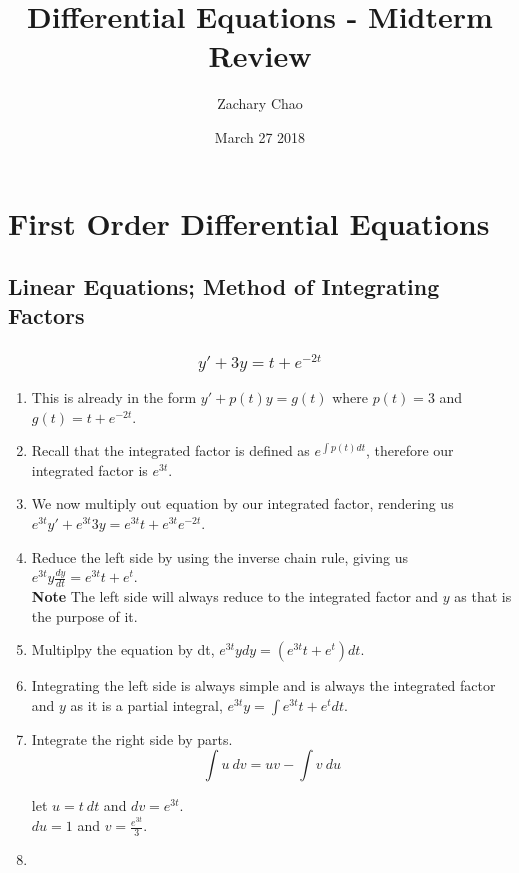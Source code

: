 \documentclass[12pt, letterpaper, twoside]{article}
\title{Differential Equations - Midterm Review}
\author{Zachary Chao}
\date{March 27 2018}
\begin{document}
\maketitle

\setcounter{section}{1}

\section{First Order Differential Equations}
\subsection{Linear Equations; Method of Integrating Factors}
\subsubsection{$$y'+3y=t+e^{-2t}$$}

\begin{enumerate}
	\item This is already in the form $y'+p(t)y=g(t)$ where $p(t)=3$ and $g(t)=t+e^{-2t}$.
	\item Recall that the integrated factor is defined as $e^{\int p(t)dt}$, therefore our integrated factor is $e^{3t}$.
	\item We now multiply out equation by our integrated factor, rendering us $e^{3t}y'+e^{3t}3y=e^{3t}t+e^{3t}e^{-2t}$.
	\item Reduce the left side by using the inverse chain rule, giving us $e^{3t}y\frac{dy}{dt}=e^{3t}t+e^{t}$.\\
		\textbf{Note} The left side will always reduce to the integrated factor and $y$ as that is the purpose of it.
	\item Multiplpy the equation by dt, $e^{3t}ydy=(e^{3t}t+e^{t})dt$.
	\item Integrating the left side is always simple and is always the integrated factor and $y$ as it is a partial integral, $e^{3t}y=\int e^{3t}t+e^{t}dt$.
	\item Integrate the right side by parts.
		$$\int u\ dv = uv - \int v\ du$$
		
		let $u=t \ dt$ and $dv=e^{3t}$.\\
		$du=1$ and $v=\frac{e^{3t}}{3}$.\\
		

	\item
\end{enumerate}
\end{document}
